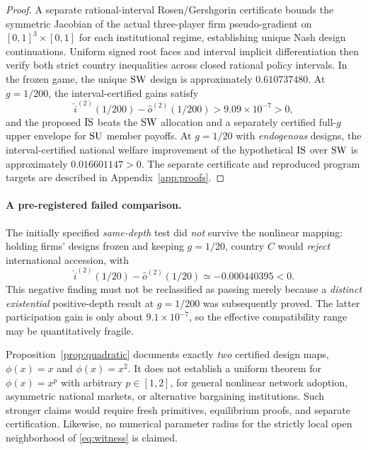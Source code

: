 \begin{proof}
A separate rational-interval Rosen/Gershgorin
certificate bounds the symmetric Jacobian of the
actual three-player firm pseudo-gradient on
$[0,1]^3\times[0,1]$ for each institutional regime,
establishing unique Nash design continuations.
Uniform signed root faces and interval implicit
differentiation then verify both strict country
inequalities across closed rational policy intervals.
In the frozen game, the unique $\mathrm{SW}$ design is
approximately $0.610737480$. At $g=1/200$,
the interval-certified gains satisfy
\[
 \widehat{i}^{(2)}(1/200)-
 \widehat{o}^{(2)}(1/200)>9.09\times10^{-7}>0,
\]
and the proposed $\mathrm{IS}$ beats the $\mathrm{SW}$ allocation
and a separately certified full-$g$ upper envelope
for $\mathrm{SU}$ member payoffs. At $g=1/20$ with
\emph{endogenous} designs, the interval-certified
national welfare improvement of the hypothetical
$\mathrm{IS}$ over $\mathrm{SW}$ is approximately $0.016601147>0$.
The separate certificate and reproduced program
targets are described in
Appendix~\ref{app:proofs}.
\end{proof}

\paragraph{A pre-registered failed comparison.}
The initially specified \emph{same-depth} test did
\emph{not} survive the nonlinear mapping: holding
firms' designs frozen and keeping $g=1/20$,
country $C$ would \emph{reject} international
accession, with
\begin{equation}\label{eq:failed-comparison}
 \widehat{i}^{(2)}(1/20)-
 \widehat{o}^{(2)}(1/20)\simeq-0.000440395<0.
\end{equation}
This negative finding must not be reclassified as
passing merely because a \emph{distinct existential}
positive-depth result at $g=1/200$ was subsequently
proved. The latter participation gain is only about
$9.1\times10^{-7}$, so the effective compatibility
range may be quantitatively fragile.

Proposition~\ref{prop:quadratic} documents exactly
\emph{two} certified design maps, $\phi(x)=x$
and $\phi(x)=x^2$. It does not establish a
uniform theorem for $\phi(x)=x^p$ with arbitrary
$p\in[1,2]$, for general nonlinear network adoption,
asymmetric national markets, or alternative bargaining
institutions. Such stronger claims would require
fresh primitives, equilibrium proofs, and separate
certification. Likewise, no numerical parameter
radius for the strictly local open neighborhood of
\eqref{eq:witness} is claimed.
